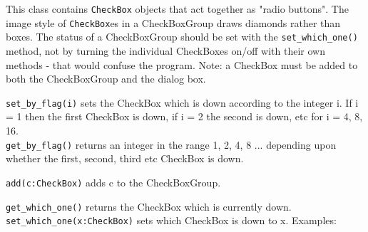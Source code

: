 
This class contains \texttt{CheckBox} objects that act together as
"radio buttons". The image style of \texttt{CheckBox}es in a
CheckBoxGroup draws diamonds rather
than boxes. The status of a CheckBoxGroup should be set with the
\texttt{set\_which\_one()} method, not by turning the individual CheckBoxes
on/off with their own methods - that would confuse the program. Note: a
CheckBox must be added to both the CheckBoxGroup and the dialog box.

\texttt{set\_by\_flag(i)} sets the CheckBox which is down according to the
integer i. If i = 1 then the first CheckBox is down, if i = 2 the
second is down, etc for i = 4, 8, 16.\\
\texttt{get\_by\_flag()} returns an integer in the range 1, 2, 4, 8 ...
depending upon whether the first, second, third etc CheckBox is down.

\texttt{add(c:CheckBox)} adds c to the CheckBoxGroup.

\texttt{get\_which\_one()} returns the CheckBox which is currently down.\\
\texttt{set\_which\_one(x:CheckBox)} sets which CheckBox is down to x. Examples:


